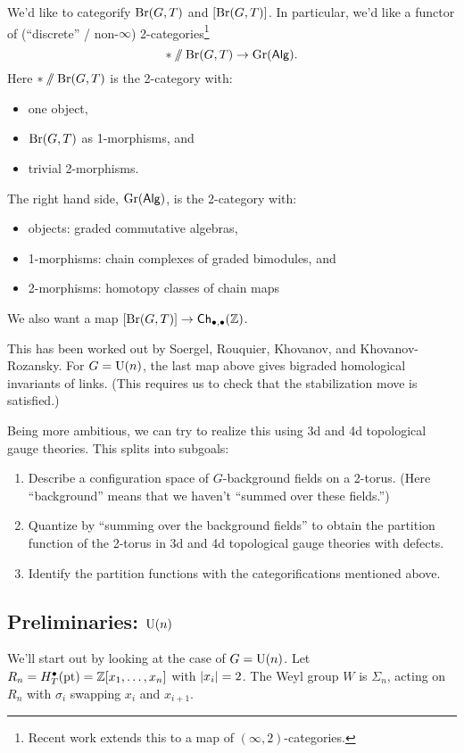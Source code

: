 We'd like to categorify $\mathrm{Br}(G, T)$ and $[\mathrm{Br}(G, T)]$.
In particular, we'd like a functor of (``discrete'' / non-$\infty$) 2-categories\footnote{Recent work extends this to a map of $(\infty, 2)$-categories.}
\[
	* \mathbin{/\mkern-6mu/} \mathrm{Br}(G, T) \to \operatorname{Gr}(\mathsf{Alg}).
\]
Here $* \mathbin{/\mkern-6mu/} \mathrm{Br}(G, T)$ is the 2-category with:
\begin{itemize}
	\item one object,
	\item $\mathrm{Br}(G, T)$ as 1-morphisms, and
	\item trivial 2-morphisms.
\end{itemize}
The right hand side, $\operatorname{Gr}(\mathsf{Alg})$, is the 2-category with:
\begin{itemize}
	\item objects: graded commutative algebras,
	\item 1-morphisms: chain complexes of graded bimodules, and
	\item 2-morphisms: homotopy classes of chain maps
\end{itemize}
We also want a map $[\mathrm{Br}(G, T)] \to \mathsf{Ch}_{\bullet,\bullet}(\mathbb{Z})$.

This has been worked out by Soergel, Rouquier, Khovanov, and Khovanov-Rozansky.
For $G = \mathrm{U}(n)$, the last map above gives bigraded homological invariants of links.
(This requires us to check that the stabilization move is satisfied.)

Being more ambitious, we can try to realize this using 3d and 4d topological gauge theories.
This splits into subgoals:
\begin{enumerate}
	\item Describe a configuration space of $G$-background fields on a 2-torus.
		(Here ``background'' means that we haven't ``summed over these fields.'')
	\item Quantize by ``summing over the background fields'' to obtain the partition function of the 2-torus in 3d and 4d topological gauge theories with defects.
	\item Identify the partition functions with the categorifications mentioned above.
\end{enumerate}

\subsection{Preliminaries: $\mathrm{U}(n)$}

We'll start out by looking at the case of $G = \mathrm{U}(n)$.
Let $R_n = H_T^\bullet(\operatorname{pt}) = \mathbb{Z}[x_1, \dots, x_n]$ with $\left|x_i\right| = 2$.
The Weyl group $W$ is $\Sigma_n$, acting on $R_n$ with $\sigma_i$ swapping $x_i$ and $x_{i+1}$.

